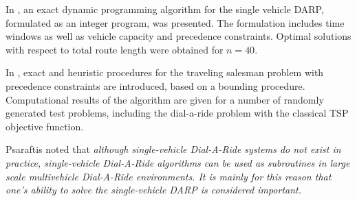 \documentclass[dissertation,draft*]{aaltoseries}
\begin{document}
In \cite{desrosiers01}, an exact dynamic programming algorithm for the single vehicle DARP, formulated as an integer program, 
was presented. The formulation includes time windows as well as vehicle capacity 
and precedence constraints. Optimal solutions with respect to total route length were obtained for $n=40$.

In \cite{bianco}, exact and heuristic procedures 
for the traveling salesman problem with precedence constraints are introduced, based on
a bounding procedure. Computational results of the algorithm are given for a number
of randomly generated test problems, including the dial-a-ride problem with the classical
TSP objective function.

Psaraftis noted that \emph{although single-vehicle Dial-A-Ride systems do not exist in 
practice, single-vehicle Dial-A-Ride algorithms can be used as subroutines in
large scale multivehicle Dial-A-Ride environments. It is mainly for this reason
that one's ability to solve the single-vehicle DARP is considered important.}
\end{document}
